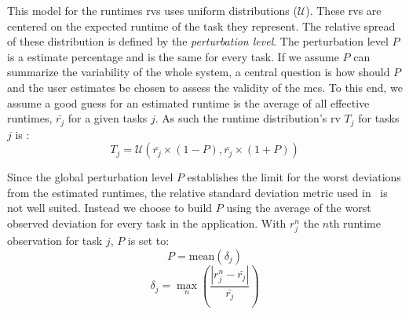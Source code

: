 \documentclass[]{llncs}
\begin{document}
This model for the runtimes \acp{rv} uses uniform distributions ($\mathcal{U}$). 
These \acp{rv} are centered on the expected runtime of the task they represent. 
The relative spread of these distribution is defined by the 
\emph{perturbation level}. The perturbation level $P$ is a estimate percentage
and is the same for every task. If we assume $P$ can summarize the variability 
of the whole system, a central question is how should $P$ and the user estimates
be chosen to assess the validity of the \ac{mcs}. To this end, we assume a good
guess for an  estimated runtime is the  average of all effective runtimes,
$\bar{r_j}$ for a given tasks $j$. As such the runtime distribution's \ac{rv} 
$T_j$ for tasks $j$ is :
\begin{equation}
	T_j = \mathcal{U}(\bar{r_j}\times(1-P), \bar{r_j}\times(1+P))
\end{equation}

Since the global perturbation level $P$ establishes the limit for the worst
deviations from the estimated runtimes, the relative standard deviation metric
used in~\cite{LeitnerC16} is not well suited. Instead we choose to build $P$
using the average of the worst observed deviation for every task in the
application. With $r_j^n$ the $n$th runtime observation for task $j$, $P$ is set
to:
\begin{equation}
P = \textrm{mean}(\delta{}_j)
\label{eq:P}
\end{equation}
\begin{equation}
\delta{}_j =
\max_n\left(\frac{|r_j^n-\bar{r_j}|}{\bar{r_j}}\right)
\label{eq:d}
\end{equation}
\end{document}
